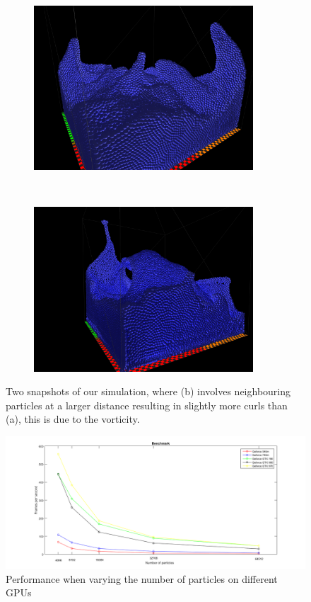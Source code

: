 \begin{figure}[H]
\centering
\begin{subfigure}{.9\textwidth}
  \centering
  \includegraphics[width=0.9\textwidth]{img/55296_edit.png}
  \caption{}
\end{subfigure}%
\\
\begin{subfigure}{.9\textwidth}
  \centering
  \includegraphics[width=0.9\textwidth]{img/3Nieghbours_55size.png}
  \caption{}
\end{subfigure}%

\caption{Two snapshots of our simulation, where (b) involves neighbouring particles at a larger distance resulting in slightly more curls than (a), this is due to the vorticity.}
\label{fig:result}
\end{figure}

\begin{figure}[H]
\hspace*{-2.1cm}
  \label{fig:graph}
  \centering
  \includegraphics[scale=0.5]{img/graph.png}
  \caption{Performance when varying the number of particles on different GPUs}
\end{figure}


